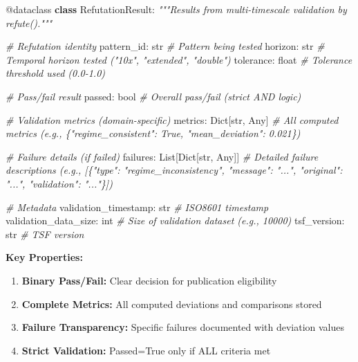 \documentclass[
]{article}
\newenvironment{Shaded}{}{}
\newcommand{\AttributeTok}[1]{\textcolor[rgb]{0.49,0.56,0.16}{#1}}
\newcommand{\BuiltInTok}[1]{\textcolor[rgb]{0.00,0.50,0.00}{#1}}
\newcommand{\CommentTok}[1]{\textcolor[rgb]{0.38,0.63,0.69}{\textit{#1}}}
\newcommand{\KeywordTok}[1]{\textcolor[rgb]{0.00,0.44,0.13}{\textbf{#1}}}
\newcommand{\NormalTok}[1]{#1}
\providecommand{\tightlist}{%
  \setlength{\itemsep}{0pt}\setlength{\parskip}{0pt}}
\begin{document}
\begin{Shaded}
\begin{Highlighting}[]
\AttributeTok{@dataclass}
\KeywordTok{class}\NormalTok{ RefutationResult:}
    \CommentTok{"""Results from multi{-}timescale validation by refute()."""}

    \CommentTok{\# Refutation identity}
\NormalTok{    pattern\_id: }\BuiltInTok{str}                        \CommentTok{\# Pattern being tested}
\NormalTok{    horizon: }\BuiltInTok{str}                           \CommentTok{\# Temporal horizon tested ("10x", "extended", "double")}
\NormalTok{    tolerance: }\BuiltInTok{float}                       \CommentTok{\# Tolerance threshold used (0.0{-}1.0)}

    \CommentTok{\# Pass/fail result}
\NormalTok{    passed: }\BuiltInTok{bool}                           \CommentTok{\# Overall pass/fail (strict AND logic)}

    \CommentTok{\# Validation metrics (domain{-}specific)}
\NormalTok{    metrics: Dict[}\BuiltInTok{str}\NormalTok{, Any]                }\CommentTok{\# All computed metrics (e.g., \{"regime\_consistent": True, "mean\_deviation": 0.021\})}

    \CommentTok{\# Failure details (if failed)}
\NormalTok{    failures: List[Dict[}\BuiltInTok{str}\NormalTok{, Any]]         }\CommentTok{\# Detailed failure descriptions (e.g., [\{"type": "regime\_inconsistency", "message": "...", "original": "...", "validation": "..."\}])}

    \CommentTok{\# Metadata}
\NormalTok{    validation\_timestamp: }\BuiltInTok{str}              \CommentTok{\# ISO8601 timestamp}
\NormalTok{    validation\_data\_size: }\BuiltInTok{int}              \CommentTok{\# Size of validation dataset (e.g., 10000)}
\NormalTok{    tsf\_version: }\BuiltInTok{str}                       \CommentTok{\# TSF version}
\end{Highlighting}
\end{Shaded}

\textbf{Key Properties:}

\begin{enumerate}
\def\labelenumi{\arabic{enumi}.}
\tightlist
\item
  \textbf{Binary Pass/Fail:} Clear decision for publication eligibility
\item
  \textbf{Complete Metrics:} All computed deviations and comparisons
  stored
\item
  \textbf{Failure Transparency:} Specific failures documented with
  deviation values
\item
  \textbf{Strict Validation:} Passed=True only if ALL criteria met
\end{enumerate}
\end{document}
